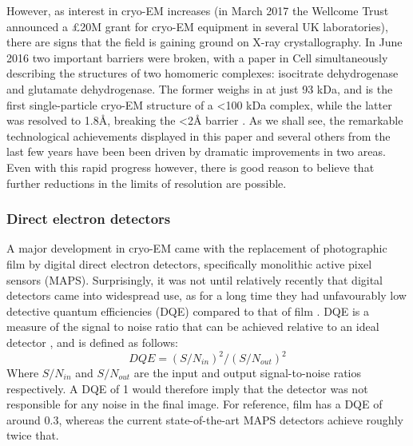 \documentclass[a4paper,11pt,twoside,openright]{scrbook}
\begin{document}
However, as interest in cryo-EM increases (in March 2017 the Wellcome Trust announced a £20M grant for cryo-EM equipment in several UK laboratories), there are signs that the field is gaining ground on X-ray crystallography. In June 2016 two important barriers were broken, with a paper in Cell simultaneously describing the structures of two homomeric complexes: isocitrate dehydrogenase and glutamate dehydrogenase. The former weighs in at just 93 kDa, and is the first single-particle cryo-EM structure of a <100 kDa complex, while the latter was resolved to 1.8Å, breaking the <2Å barrier \cite{Merk2016}. As we shall see, the remarkable technological achievements displayed in this paper and several others from the last few years have been been driven by dramatic improvements in two areas\cite{Bai2015}. Even with this rapid progress however, there is good reason to believe that further reductions in the limits of resolution are possible.

\subsubsection{Direct electron detectors}
A major development in cryo-EM came with the replacement of photographic film by digital direct electron detectors, specifically monolithic active pixel sensors (MAPS). Surprisingly, it was not until relatively recently that digital detectors came into widespread use, as for a long time they had unfavourably low detective quantum efficiencies (DQE) compared to that of film \cite{McMullan2009}. DQE is a measure of the signal to noise ratio that can be achieved relative to an ideal detector \cite{Dainty1975}, and is defined as follows:
\begin{displaymath}
    DQE = (S/N_{in})^{2}/(S/N_{out})^{2}
\end{displaymath}
Where \begin{math} S/N_{in} \end{math} and \begin{math} S/N_{out} \end{math} are the input and output signal-to-noise ratios respectively. A DQE of 1 would therefore imply that the detector was not responsible for any noise in the final image. For reference, film has a DQE of around 0.3, whereas the current state-of-the-art MAPS detectors achieve roughly twice that.
\end{document}
